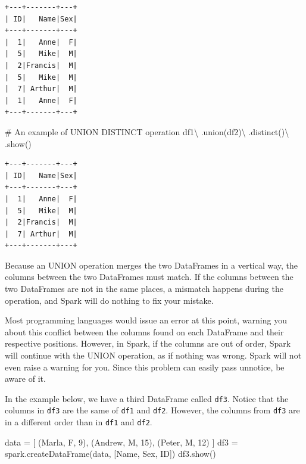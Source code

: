 \documentclass[
  11pt,
  letterpaper,
  DIV=11,
  numbers=noendperiod]{scrreprt}
\newenvironment{Shaded}{\begin{snugshade}}{\end{snugshade}}
\newcommand{\CommentTok}[1]{\textcolor[rgb]{0.37,0.37,0.37}{#1}}
\newcommand{\DecValTok}[1]{\textcolor[rgb]{0.68,0.00,0.00}{#1}}
\newcommand{\NormalTok}[1]{\textcolor[rgb]{0.00,0.23,0.31}{#1}}
\newcommand{\OperatorTok}[1]{\textcolor[rgb]{0.37,0.37,0.37}{#1}}
\newcommand{\StringTok}[1]{\textcolor[rgb]{0.13,0.47,0.30}{#1}}
\begin{document}
\begin{verbatim}
+---+-------+---+
| ID|   Name|Sex|
+---+-------+---+
|  1|   Anne|  F|
|  5|   Mike|  M|
|  2|Francis|  M|
|  5|   Mike|  M|
|  7| Arthur|  M|
|  1|   Anne|  F|
+---+-------+---+
\end{verbatim}

\begin{Shaded}
\begin{Highlighting}[]
\CommentTok{\# An example of UNION DISTINCT operation}
\NormalTok{df1}\OperatorTok{\textbackslash{}}
\NormalTok{    .union(df2)}\OperatorTok{\textbackslash{}}
\NormalTok{    .distinct()}\OperatorTok{\textbackslash{}}
\NormalTok{    .show()}
\end{Highlighting}
\end{Shaded}

\begin{verbatim}
+---+-------+---+
| ID|   Name|Sex|
+---+-------+---+
|  1|   Anne|  F|
|  5|   Mike|  M|
|  2|Francis|  M|
|  7| Arthur|  M|
+---+-------+---+
\end{verbatim}

Because an UNION operation merges the two DataFrames in a vertical way,
the columns between the two DataFrames must match. If the columns
between the two DataFrames are not in the same places, a mismatch
happens during the operation, and Spark will do nothing to fix your
mistake.

Most programming languages would issue an error at this point, warning
you about this conflict between the columns found on each DataFrame and
their respective positions. However, in Spark, if the columns are out of
order, Spark will continue with the UNION operation, as if nothing was
wrong. Spark will not even raise a warning for you. Since this problem
can easily pass unnotice, be aware of it.

In the example below, we have a third DataFrame called \texttt{df3}.
Notice that the columns in \texttt{df3} are the same of \texttt{df1} and
\texttt{df2}. However, the columns from \texttt{df3} are in a different
order than in \texttt{df1} and \texttt{df2}.

\begin{Shaded}
\begin{Highlighting}[]
\NormalTok{data }\OperatorTok{=}\NormalTok{ [}
\NormalTok{    (}\StringTok{\textquotesingle{}Marla\textquotesingle{}}\NormalTok{, }\StringTok{\textquotesingle{}F\textquotesingle{}}\NormalTok{, }\DecValTok{9}\NormalTok{),}
\NormalTok{    (}\StringTok{\textquotesingle{}Andrew\textquotesingle{}}\NormalTok{, }\StringTok{\textquotesingle{}M\textquotesingle{}}\NormalTok{, }\DecValTok{15}\NormalTok{),}
\NormalTok{    (}\StringTok{\textquotesingle{}Peter\textquotesingle{}}\NormalTok{, }\StringTok{\textquotesingle{}M\textquotesingle{}}\NormalTok{, }\DecValTok{12}\NormalTok{)}
\NormalTok{]}
\NormalTok{df3 }\OperatorTok{=}\NormalTok{ spark.createDataFrame(data, [}\StringTok{\textquotesingle{}Name\textquotesingle{}}\NormalTok{, }\StringTok{\textquotesingle{}Sex\textquotesingle{}}\NormalTok{, }\StringTok{\textquotesingle{}ID\textquotesingle{}}\NormalTok{])}
\NormalTok{df3.show()}
\end{Highlighting}
\end{Shaded}
\end{document}
